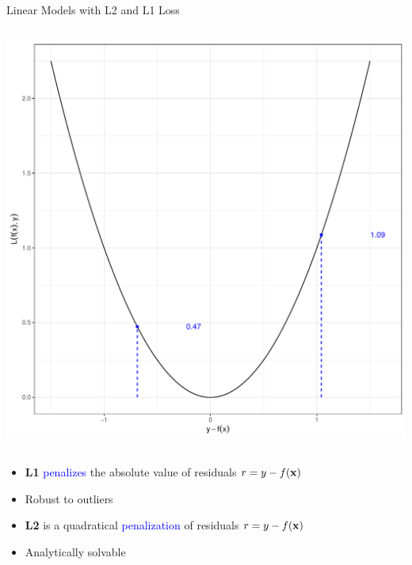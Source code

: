 \documentclass[11pt,compress,t,notes=noshow, xcolor=table]{beamer}
\begin{document}
\begin{vbframe}{Linear Models with L2 and L1 Loss}
\begin{columns}
\begin{column}{0.4\textwidth}
\begin{center}
  \includegraphics[width = \textwidth]{slides/supervised-regression/figure/nutshell-regression-L2.pdf}
\end{center}
\end{column}
\end{columns}

\hspace{0.5cm}
\begin{minipage}[t]{0.45\textwidth}
    \footnotesize
    \begin{itemize}
        \item \small \textbf{L1} \textcolor{blue}{penalizes} the absolute value of residuals \textbf{$r = y - f(\mathbf{x})$}
        \item \small Robust to outliers

    \end{itemize}
\end{minipage}
\hfill
\begin{minipage}[t]{0.45\textwidth}
    \footnotesize
    \begin{itemize}
        \item \small \textbf{L2} is a quadratical \textcolor{blue}{penalization} of residuals \textbf{$r = y - f(\mathbf{x})$}
        \item \small Analytically solvable
        

    \end{itemize}
\end{minipage}



\end{vbframe}
\end{document}
